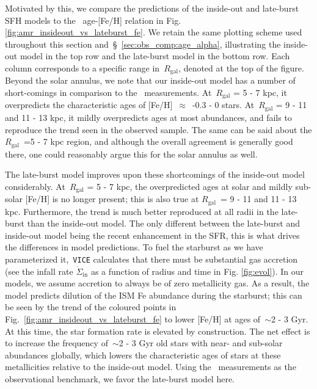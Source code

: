 \documentclass[fleqn, usenatbib]{mnras}
\begin{document}
Motivated by this, we compare the predictions of the inside-out and late-burst 
SFH models to the~\citet{Feuillet2019} age-[Fe/H] relation in Fig. 
\ref{fig:amr_insideout_vs_lateburst_fe}. We retain the same plotting scheme 
used throughout this section and~\S~\ref{sec:obs_comp:age_alpha}, illustrating 
the inside-out model in the top row and the late-burst model in the bottom row. 
Each column corresponds to a specific range in~$R_\text{gal}$, denoted at the 
top of the figure. Beyond the solar annulus, we note that our inside-out model 
has a number of short-comings in comparison to the~\citet{Feuillet2019} 
measurements. At~$R_\text{gal}$ = 5 - 7 kpc, it overpredicts the characteristic 
ages of [Fe/H]~$\approx$~-0.3 - 0 stars. At~$R_\text{gal}$ = 9 - 11 and 11 - 13 
kpc, it mildly overpredicts ages at most abundances, and fails to reproduce the 
trend seen in the observed sample. The same can be said about the 
$R_\text{gal}$~=5 - 7 kpc region, and although the overall agreement is 
generally good there, one could reasonably argue this for the solar annulus as 
well. 
\par 
The late-burst model improves upon these shortcomings of the inside-out model 
considerably. At~$R_\text{gal}$ = 5 - 7 kpc, the overpredicted ages at solar 
and mildly sub-solar [Fe/H] is no longer present; this is also true at 
$R_\text{gal}$~= 9 - 11 and 11 - 13 kpc. Furthermore, the trend is much better 
reproduced at all radii in the late-burst than the inside-out model. The only 
different between the late-burst and inside-out model being the recent 
enhancement in the SFR, this is what drives the differences in model 
predictions. To fuel the starburst as we have parameterized it,~\texttt{VICE} 
calculates that there must be substantial gas accretion (see the infall rate 
$\dot{\Sigma}_\text{in}$ as a function of radius and time in Fig. 
\ref{fig:evol}). In our models, we assume accretion to always be of zero 
metallicity gas. As a result, the model predicts dilution of the ISM Fe 
abundance during the starburst; this can be seen by the trend of the coloured 
points in Fig.~\ref{fig:amr_insideout_vs_lateburst_fe} to lower [Fe/H] at ages 
of~$\sim$2 - 3 Gyr. At this time, the star formation rate is elevated by 
construction. The net effect is to increase the frequency of~$\sim$2 - 3 Gyr 
old stars with near- and sub-solar abundances globally, which lowers the 
characteristic ages of stars at these metallicities relative to the inside-out 
model. Using the~\citet{Feuillet2019} measurements as the observational 
benchmark, we favor the late-burst model here. 
\end{document}
